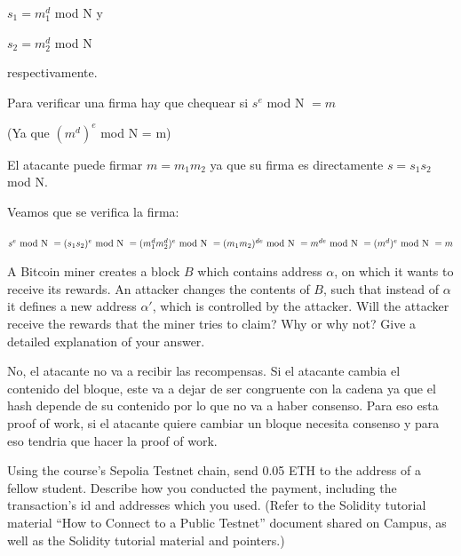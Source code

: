\documentclass[12pt,addpoints,answers]{exam}
\begin{document}
\begin{questions}
\begin{solution}
    $s_1= m_1^d$ mod N  y  
    
    $s_2 = m_2^d$ mod N

    respectivamente.

    Para verificar una firma hay que chequear si $s^e$ mod N $= m$

    (Ya que $(m^d)^e$ mod N = m)

    El atacante puede firmar $m = m_1 m_2$ ya que su firma es directamente $s = s_1 s_2$ mod N.


    Veamos que se verifica la firma:

    $s^e \text{ mod N } = 
    (s_1 s_2)^e \text{ mod N } = 
    (m_1^d m_2^d)^e \text{ mod N } = 
    (m_1 m_2)^{d e} \text{ mod N } = \\
    m^{de} \text{ mod N }
    = (m^d)^e \text{ mod N } = 
    m$
\end{solution}

\newpage

\question[10] A Bitcoin miner creates a block $B$ which contains address $\alpha$, on which it wants to receive its rewards. An attacker changes the contents of $B$, such that instead of $\alpha$ it defines a new address $\alpha'$, which is controlled by the attacker. Will the attacker receive the rewards that the miner tries to claim? Why or why not? Give a detailed explanation of your answer.

\begin{solution} %

    No, el atacante no va a recibir las recompensas. Si el atacante cambia el contenido del bloque, este va a dejar
    de ser congruente con la cadena ya que el hash depende de su contenido por lo que no va a haber consenso. 
    Para eso esta proof of work, si el atacante quiere cambiar un bloque necesita consenso y para eso tendria que hacer
    la proof of work.

\end{solution}

\newpage

\question[10] Using the course’s Sepolia  Testnet chain, send 0.05 ETH to the address of a fellow student. Describe how you conducted the payment, including the transaction’s id and addresses which you used. (Refer to the Solidity tutorial material “How to Connect
to a Public Testnet” document shared on Campus, as well as the Solidity
tutorial material and pointers.) 

\begin{solution} %


\end{solution}
\end{questions}
\end{document}
